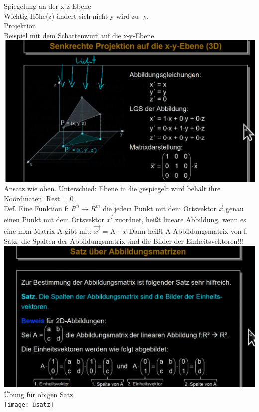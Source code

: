 \documentclass{article}
\begin{document}
	Spiegelung an der x-z-Ebene \\
	Wichtig Höhe(z) ändert sich nicht y wird zu -y. \\
	Projektion \\
	Beispiel mit dem Schattenwurf auf die x-y-Ebene \\
	\includegraphics[width=\linewidth]{proschatten}
	Ansatz wie oben. Unterschied: Ebene in die gespiegelt wird behält ihre Koordinaten. Rest = 0 \\
	Def. Eine Funktion f: $R^n \to R^m$ die jedem Punkt mit dem Ortsvektor $\vec{x}$ genau einen Punkt mit dem Ortsvektor $\vec{x'}$ zuordnet, heißt lineare Abbildung, wenn es eine mxn Matrix A gibt  mit: $\vec{x'}$ = A $\cdot$ $\vec{x}$ Dann heißt A Abbildungsmatrix  von f. \\
	Satz: die Spalten der Abbildungsmatrix sind die Bilder der Einheitsvektoren!!! \\
	\includegraphics[width=\linewidth]{satz} \\
	Übung für obigen Satz \\
	\texttt{[image: üsatz]}
\end{document}
